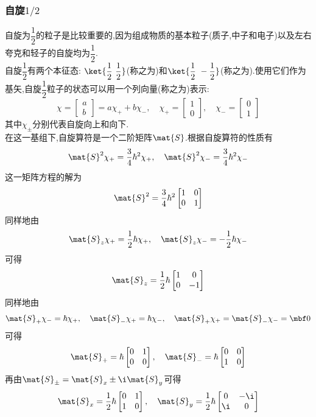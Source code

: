\documentclass{ctexart}
\begin{document}
\subsubsection{自旋$1/2$}
自旋为$\dfrac12$的粒子是比较重要的,因为组成物质的基本粒子(质子,中子和电子)以及左右夸克和轻子的自旋均为$\dfrac12$.\\
\indent 自旋$\dfrac12$有两个本征态: $\ket{\dfrac12\ \dfrac12}$(称之为)和$\ket{\dfrac12\ -\dfrac12}$(称之为).使用它们作为基矢,自旋$\dfrac12$粒子的状态可以用一个列向量(称之为)表示:
\[\chi=\begin{bmatrix}
    a\\b
\end{bmatrix}=a\chi_++b\chi_-,\quad\chi_+=\begin{bmatrix}
    1\\0
\end{bmatrix},\quad\chi_-=\begin{bmatrix}
    0\\1
\end{bmatrix}\]
其中$\chi_\pm$分别代表自旋向上和向下.\\
\indent 在这一基组下,自旋算符是一个二阶矩阵$\mat{S}$.根据自旋算符的性质有
\[\mat{S}^2\chi_+=\dfrac{3}{4}\hbar^2\chi_+,\quad\mat{S}^2\chi_-=\dfrac{3}{4}\hbar^2\chi_-\]
这一矩阵方程的解为
\[\mat{S}^2=\dfrac{3}{4}\hbar^2\begin{bmatrix}
    1&0\\0&1
\end{bmatrix}\]
同样地由
\[\mat{S}_z\chi_+=\dfrac12\hbar\chi_+,\quad\mat{S}_z\chi_-=-\dfrac12\hbar\chi_-\]
可得
\[\mat{S}_z=\dfrac12\hbar\begin{bmatrix}
    1&0\\0&-1
\end{bmatrix}\]
同样地由
\[\mat{S}_+\chi_-=\hbar\chi_+,\quad\mat{S}_-\chi_+=\hbar\chi_-,\quad\mat{S}_+\chi_+=\mat{S}_-\chi_-=\mbf0\]
可得
\[\mat{S}_+=\hbar\begin{bmatrix}
    0&1\\0&0
\end{bmatrix},\quad\mat{S}_-=\hbar\begin{bmatrix}
    0&0\\1&0
\end{bmatrix}\]
再由$\mat{S}_\pm=\mat{S}_x\pm\i\mat{S}_y$可得
\[\mat{S}_x=\dfrac12\hbar\begin{bmatrix}
    0&1\\1&0
\end{bmatrix},\quad\mat{S}_y=\dfrac12\hbar\begin{bmatrix}
    0&-\i\\\i&0
\end{bmatrix}\]
\end{document}
